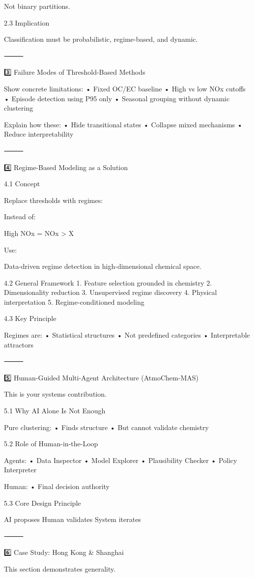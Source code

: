 Not binary partitions.

2.3 Implication

Classification must be probabilistic, regime-based, and dynamic.

⸻

3️⃣ Failure Modes of Threshold-Based Methods

Show concrete limitations:
	•	Fixed OC/EC baseline
	•	High vs low NOx cutoffs
	•	Episode detection using P95 only
	•	Seasonal grouping without dynamic clustering

Explain how these:
	•	Hide transitional states
	•	Collapse mixed mechanisms
	•	Reduce interpretability

⸻

4️⃣ Regime-Based Modeling as a Solution

4.1 Concept

Replace thresholds with regimes:

Instead of:

High NOx = NOx > X

Use:

Data-driven regime detection in high-dimensional chemical space.

4.2 General Framework
	1.	Feature selection grounded in chemistry
	2.	Dimensionality reduction
	3.	Unsupervised regime discovery
	4.	Physical interpretation
	5.	Regime-conditioned modeling

4.3 Key Principle

Regimes are:
	•	Statistical structures
	•	Not predefined categories
	•	Interpretable attractors

⸻

5️⃣ Human-Guided Multi-Agent Architecture (AtmoChem-MAS)

This is your systems contribution.

5.1 Why AI Alone Is Not Enough

Pure clustering:
	•	Finds structure
	•	But cannot validate chemistry

5.2 Role of Human-in-the-Loop

Agents:
	•	Data Inspector
	•	Model Explorer
	•	Plausibility Checker
	•	Policy Interpreter

Human:
	•	Final decision authority

5.3 Core Design Principle

AI proposes
Human validates
System iterates

⸻

6️⃣ Case Study: Hong Kong & Shanghai

This section demonstrates generality.

